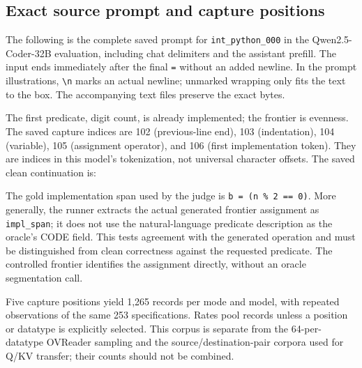 \subsection{Exact source prompt and capture positions}
The following is the complete saved prompt for \texttt{int\_python\_000} in the Qwen2.5-Coder-32B evaluation, including chat delimiters and the assistant prefill. The input ends immediately after the final \texttt{=} without an added newline. In the prompt illustrations, \texttt{\textbackslash n} marks an actual newline; unmarked wrapping only fits the text to the box. The accompanying text files preserve the exact bytes.

The first predicate, digit count, is already implemented; the frontier is evenness. The saved capture indices are 102 (previous-line end), 103 (indentation), 104 (variable), 105 (assignment operator), and 106 (first implementation token). They are indices in this model's tokenization, not universal character offsets. The saved clean continuation is:

The gold implementation span used by the judge is \texttt{b = (n \% 2 == 0)}. More generally, the runner extracts the actual generated frontier assignment as \texttt{impl\_span}; it does not use the natural-language predicate description as the oracle's CODE field. This tests agreement with the generated operation and must be distinguished from clean correctness against the requested predicate. The controlled frontier identifies the assignment directly, without an oracle segmentation call.

Five capture positions yield 1,265 records per mode and model, with repeated observations of the same 253 specifications. Rates pool records unless a position or datatype is explicitly selected. This corpus is separate from the 64-per-datatype OVReader sampling and the source/destination-pair corpora used for Q/KV transfer; their counts should not be combined.
